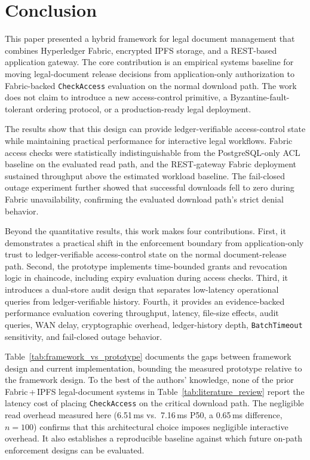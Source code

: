 \documentclass{ieeeaccess}
\begin{document}
\FloatBarrier
\section{Conclusion}
\label{sec:conclusion}

This paper presented a hybrid framework for legal document management that
combines Hyperledger Fabric, encrypted IPFS storage, and a REST-based
application gateway. The core contribution is an empirical systems baseline
for moving legal-document release decisions from application-only
authorization to Fabric-backed \texttt{CheckAccess} evaluation on the normal
download path. The work does not claim to introduce a new access-control
primitive, a Byzantine-fault-tolerant ordering protocol, or a production-ready
legal deployment.

The results show that this design can provide ledger-verifiable
access-control state while maintaining practical performance for interactive
legal workflows. Fabric access checks were statistically indistinguishable
from the PostgreSQL-only ACL baseline on the evaluated read path, and the
REST-gateway Fabric deployment sustained throughput above the estimated
workload baseline. The fail-closed outage experiment further showed that
successful downloads fell to zero during Fabric unavailability, confirming
the evaluated download path's strict denial behavior.

Beyond the quantitative results, this work makes four contributions. First,
it demonstrates a practical shift in the enforcement boundary from
application-only trust to ledger-verifiable access-control state on the normal
document-release path. Second, the prototype implements time-bounded grants
and revocation logic in chaincode, including expiry evaluation during access
checks. Third, it introduces a dual-store audit design that separates
low-latency operational queries from ledger-verifiable history. Fourth, it
provides an evidence-backed performance evaluation covering throughput,
latency, file-size effects, audit queries, WAN delay, cryptographic overhead,
ledger-history depth, \texttt{BatchTimeout} sensitivity, and fail-closed
outage behavior.

Table~\ref{tab:framework_vs_prototype} documents the gaps between framework
design and current implementation, bounding the measured prototype relative
to the framework design. To the best of the authors' knowledge, none of the
prior Fabric\,+\,IPFS legal-document systems in Table~\ref{tab:literature_review}
report the latency cost of placing \texttt{CheckAccess} on the critical
download path. The negligible read overhead measured here (6.51\,ms
vs.\ 7.16\,ms P50, a 0.65\,ms difference, $n{=}100$) confirms that this
architectural choice imposes negligible interactive overhead. It also establishes a reproducible baseline
against which future on-path enforcement designs can be evaluated.
\end{document}
